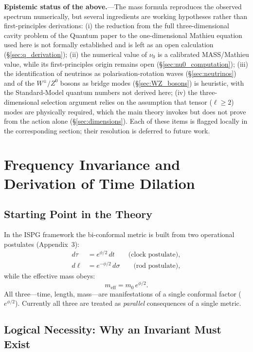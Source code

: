 \documentclass[11pt]{article}
\begin{document}
\medskip
\noindent\textbf{Epistemic status of the above.}---The mass formula
reproduces the observed spectrum numerically, but several ingredients
are working hypotheses rather than first-principles derivations:
(i) the reduction from the full three-dimensional cavity problem of
the Quantum paper to the one-dimensional Mathieu equation used here
is not formally established and is left as an open calculation
(\S\ref{sec:q_derivation});
(ii) the numerical value of $\nu_0$ is a calibrated
MASS/Mathieu value, while its first-principles origin remains
open (\S\ref{sec:nu0_computation});
(iii) the identification of neutrinos as polarisation-rotation waves
(\S\ref{sec:neutrinos}) and of the $W^\pm/Z^0$ bosons as bridge
modes (\S\ref{sec:WZ_bosons}) is heuristic, with the Standard-Model
quantum numbers not derived here;
(iv) the three-dimensional selection argument relies on the
assumption that tensor ($\ell\geq 2$) modes are physically required,
which the main theory invokes but does not prove from the action
alone (\S\ref{sec:dimensions}).
Each of these items is flagged locally in the corresponding section;
their resolution is deferred to future work.

\section{Frequency Invariance and Derivation of Time Dilation}
\label{sec:freq_invariance}

\subsection{Starting Point in the Theory}

In the ISPG framework the bi-conformal metric is built from two
operational postulates (Appendix~3):
\begin{align}
  d\tau &= e^{\phi/2}\,dt
  \qquad\text{(clock postulate)},
  \label{eq:clock_here}\\[4pt]
  d\ell &= e^{-\phi/2}\,d\sigma
  \qquad\text{(rod postulate)},
  \label{eq:rod_here}
\end{align}
while the effective mass obeys:
\begin{equation}
  m_{\mathrm{eff}} = m_0\,e^{\phi/2}.
  \label{eq:mass_here}
\end{equation}
All three---time, length, mass---are manifestations of a single
conformal factor ($e^{\phi/2}$). Currently all three are treated
as \emph{parallel} consequences of a single metric.

\subsection{Logical Necessity: Why an Invariant Must Exist}
\end{document}
